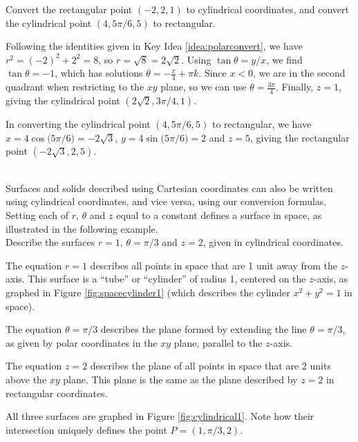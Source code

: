 {Convert the rectangular point $(-2,2,1)$ to cylindrical coordinates, and convert the cylindrical point $(4,5\pi/6,5)$ to rectangular.
}
{Following the identities given in Key Idea \ref{idea:polarconvert}, we have $r^2=(-2)^2+2^2=8$, so $r = \sqrt8 = 2\sqrt{2}$. Using $\tan\theta = y/x$, we find $\tan\theta=-1$, which has solutions $\theta=-\frac{\pi}{4}+\pi k$.  Since $x<0$, we are in the second quadrant when restricting to the $xy$ plane, so we can use $\theta=\frac{3\pi}{4}$.  Finally, $z = 1$, giving the cylindrical point $(2\sqrt2,3\pi/4,1)$.

In converting the cylindrical point $(4,5\pi/6,5)$ to rectangular, we have
$x = 4\cos\big(5\pi/6\big) = -2\sqrt{3}$, $y = 4\sin\big(5\pi/6\big) = 2$ and $z=5$, giving the rectangular point $(-2\sqrt{3},2,5)$.
}\\

Surfaces and solids described using Cartesian coordinates can also be written using cylindrical coordinates, and vice versa, using our conversion formulas.
Setting each of $r$, $\theta$ and $z$ equal to a constant defines a surface in space, as illustrated in the following example.\\

%
{Describe the surfaces $r=1$, $\theta = \pi/3$ and $z=2$, given in cylindrical coordinates.
}
{The equation $r=1$ describes all points in space that are 1 unit away from the $z$-axis. This surface is a ``tube'' or ``cylinder'' of radius 1, centered on the $z$-axis, as graphed in Figure \ref{fig:spacecylinder1} (which describes the cylinder $x^2+y^2=1$ in space). 

The equation $\theta=\pi/3$ describes the plane formed by extending the line $\theta=\pi/3$, as given by polar coordinates in the $xy$ plane, parallel to the $z$-axis.

The equation $z=2$ describes the plane of all points in space that are 2 units above the $xy$ plane. This plane is the same as the plane described by $z=2$ in rectangular coordinates.

All three surfaces are graphed in Figure \ref{fig:cylindrical1}. Note how their intersection uniquely defines the point $P=(1,\pi/3,2)$.
}\\

